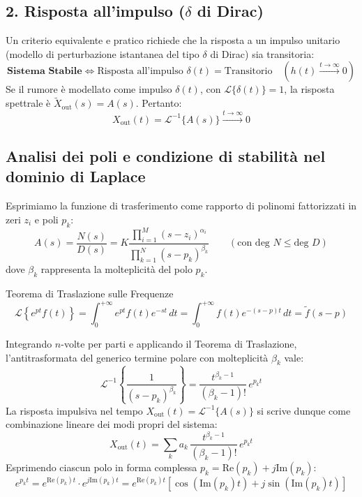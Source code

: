 \subsection{2. Risposta all'impulso ($\delta$ di Dirac)}

Un criterio equivalente e pratico richiede che la risposta a un impulso unitario (modello di perturbazione istantanea del tipo $\delta$ di Dirac) sia transitoria:
\[
    \textbf{Sistema Stabile} \iff \text{Risposta all'impulso } \delta(t) = \text{Transitorio} \quad (h(t) \xrightarrow{t \to \infty} 0)
\]
Se il rumore è modellato come impulso $\delta(t)$, con $\mathcal{L}\{\delta(t)\} = 1$, la risposta spettrale è $\tilde{X}_{\text{out}}(s) = A(s)$. Pertanto:
\[
    X_{\text{out}}(t) = \mathcal{L}^{-1}\{ A(s) \} \xrightarrow{t \to \infty} 0
\]

\subsection{Analisi dei poli e condizione di stabilità nel dominio di Laplace}

Esprimiamo la funzione di trasferimento come rapporto di polinomi fattorizzati in zeri $z_i$ e poli $p_k$:
\[
    A(s) = \frac{N(s)}{D(s)} = K \frac{\prod_{i=1}^{M} (s - z_i)^{\alpha_i}}{\prod_{k=1}^{N} (s - p_k)^{\beta_k}} \qquad (\text{con } \text{deg } N \le \text{deg } D)
\]
dove $\beta_k$ rappresenta la molteplicità del polo $p_k$.

\begin{teorema}{Teorema di Traslazione sulle Frequenze}
\[
    \mathcal{L}\left\{ e^{pt} f(t) \right\} = \int_0^{+\infty} e^{pt} f(t) e^{-st} \, dt = \int_0^{+\infty} f(t) e^{-(s-p)t} \, dt = \tilde{f}(s-p)
\]
\end{teorema}

Integrando $n$-volte per parti e applicando il Teorema di Traslazione, l'antitrasformata del generico termine polare con molteplicità $\beta_k$ vale:
\[
    \mathcal{L}^{-1}\left\{ \frac{1}{(s - p_k)^{\beta_k}} \right\} = \frac{t^{\beta_k - 1}}{(\beta_k - 1)!} \, e^{p_k t}
\]
La risposta impulsiva nel tempo $X_{\text{out}}(t) = \mathcal{L}^{-1}\{A(s)\}$ si scrive dunque come combinazione lineare dei modi propri del sistema:
\[
    X_{\text{out}}(t) = \sum_{k} a_k \, \frac{t^{\beta_k - 1}}{(\beta_k - 1)!} \, e^{p_k t}
\]
Esprimendo ciascun polo in forma complessa $p_k = \text{Re}(p_k) + j \text{Im}(p_k)$:
\[
    e^{p_k t} = e^{\text{Re}(p_k) t} \cdot e^{j \text{Im}(p_k) t} = e^{\text{Re}(p_k) t} \left[ \cos(\text{Im}(p_k) t) + j \sin(\text{Im}(p_k) t) \right]
\]

